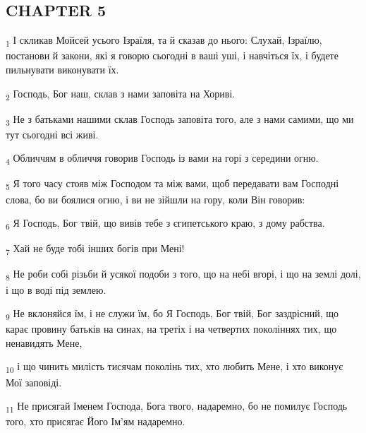 \subsection{CHAPTER 5}
\begin{tcolorbox}
\textsubscript{1} І скликав Мойсей усього Ізраїля, та й сказав до нього: Слухай, Ізраїлю, постанови й закони, які я говорю сьогодні в ваші уші, і навчіться їх, і будете пильнувати виконувати їх.
\end{tcolorbox}
\begin{tcolorbox}
\textsubscript{2} Господь, Бог наш, склав з нами заповіта на Хориві.
\end{tcolorbox}
\begin{tcolorbox}
\textsubscript{3} Не з батьками нашими склав Господь заповіта того, але з нами самими, що ми тут сьогодні всі живі.
\end{tcolorbox}
\begin{tcolorbox}
\textsubscript{4} Обличчям в обличчя говорив Господь із вами на горі з середини огню.
\end{tcolorbox}
\begin{tcolorbox}
\textsubscript{5} Я того часу стояв між Господом та між вами, щоб передавати вам Господні слова, бо ви боялися огню, і ви не зійшли на гору, коли Він говорив:
\end{tcolorbox}
\begin{tcolorbox}
\textsubscript{6} Я Господь, Бог твій, що вивів тебе з єгипетського краю, з дому рабства.
\end{tcolorbox}
\begin{tcolorbox}
\textsubscript{7} Хай не буде тобі інших богів при Мені!
\end{tcolorbox}
\begin{tcolorbox}
\textsubscript{8} Не роби собі різьби й усякої подоби з того, що на небі вгорі, і що на землі долі, і що в воді під землею.
\end{tcolorbox}
\begin{tcolorbox}
\textsubscript{9} Не вклоняйся їм, і не служи їм, бо Я Господь, Бог твій, Бог заздрісний, що карає провину батьків на синах, на третіх і на четвертих поколіннях тих, що ненавидять Мене,
\end{tcolorbox}
\begin{tcolorbox}
\textsubscript{10} і що чинить милість тисячам поколінь тих, хто любить Мене, і хто виконує Мої заповіді.
\end{tcolorbox}
\begin{tcolorbox}
\textsubscript{11} Не присягай Іменем Господа, Бога твого, надаремно, бо не помилує Господь того, хто присягає Його Ім'ям надаремно.
\end{tcolorbox}
